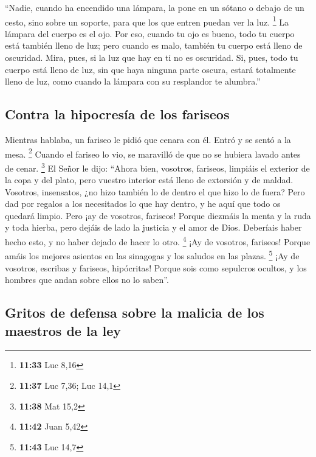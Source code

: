  ``Nadie, cuando ha encendido una lámpara, la pone en un
sótano o debajo de un cesto, sino sobre un soporte, para que los que
entren puedan ver la luz. \footnote{\textbf{11:33} Luc 8,16}
 La lámpara del cuerpo es el ojo. Por eso, cuando tu ojo
es bueno, todo tu cuerpo está también lleno de luz; pero cuando es malo,
también tu cuerpo está lleno de oscuridad.  Mira, pues,
si la luz que hay en ti no es oscuridad.  Si, pues, todo
tu cuerpo está lleno de luz, sin que haya ninguna parte oscura, estará
totalmente lleno de luz, como cuando la lámpara con su resplandor te
alumbra.''

\hypertarget{contra-la-hipocresuxeda-de-los-fariseos}{%
\subsection{Contra la hipocresía de los
fariseos}\label{contra-la-hipocresuxeda-de-los-fariseos}}

 Mientras hablaba, un fariseo le pidió que cenara con él.
Entró y se sentó a la mesa. \footnote{\textbf{11:37} Luc 7,36; Luc 14,1}
 Cuando el fariseo lo vio, se maravilló de que no se
hubiera lavado antes de cenar. \footnote{\textbf{11:38} Mat 15,2}
 El Señor le dijo: ``Ahora bien, vosotros, fariseos,
limpiáis el exterior de la copa y del plato, pero vuestro interior está
lleno de extorsión y de maldad.  Vosotros, insensatos,
¿no hizo también lo de dentro el que hizo lo de fuera? 
Pero dad por regalos a los necesitados lo que hay dentro, y he aquí que
todo os quedará limpio.  Pero ¡ay de vosotros, fariseos!
Porque diezmáis la menta y la ruda y toda hierba, pero dejáis de lado la
justicia y el amor de Dios. Deberíais haber hecho esto, y no haber
dejado de hacer lo otro. \footnote{\textbf{11:42} Juan 5,42}
 ¡Ay de vosotros, fariseos! Porque amáis los mejores
asientos en las sinagogas y los saludos en las plazas. \footnote{\textbf{11:43}
  Luc 14,7}  ¡Ay de vosotros, escribas y fariseos,
hipócritas! Porque sois como sepulcros ocultos, y los hombres que andan
sobre ellos no lo saben''.

\hypertarget{gritos-de-defensa-sobre-la-malicia-de-los-maestros-de-la-ley}{%
\subsection{Gritos de defensa sobre la malicia de los maestros de la
ley}\label{gritos-de-defensa-sobre-la-malicia-de-los-maestros-de-la-ley}}

